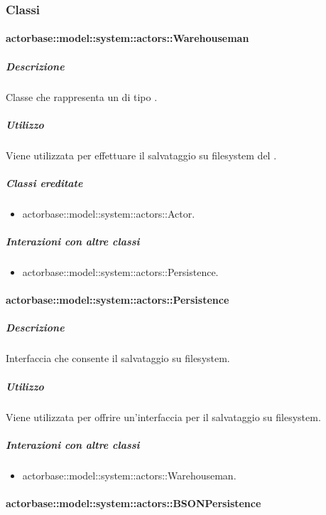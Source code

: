 \documentclass{scalatekids-article}
\begin{document}
\subsubsection{Classi}

\paragraph{actorbase::model::system::actors::Warehouseman}

\subparagraph{Descrizione}

Classe che rappresenta un  di tipo .

\subparagraph{Utilizzo}

Viene utilizzata per effettuare il salvataggio su filesystem del
.

\subparagraph{Classi ereditate}

\begin{itemize}
\item actorbase::model::system::actors::Actor.
\end{itemize}

\subparagraph{Interazioni con altre classi}

\begin{itemize}
\item actorbase::model::system::actors::Persistence.
\end{itemize}

\paragraph{actorbase::model::system::actors::Persistence}

\subparagraph{Descrizione}

Interfaccia che consente il salvataggio su filesystem.

\subparagraph{Utilizzo}

Viene utilizzata per offrire un'interfaccia per il salvataggio su filesystem.

\subparagraph{Interazioni con altre classi}

\begin{itemize}
\item actorbase::model::system::actors::Warehouseman.
\end{itemize}

\paragraph{actorbase::model::system::actors::BSONPersistence}
\end{document}
